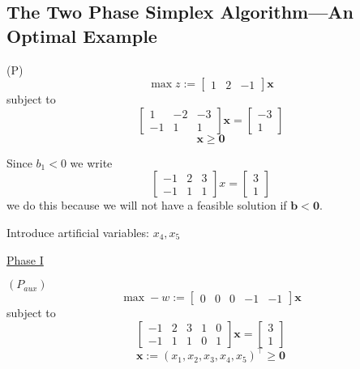 \subsection{The Two Phase Simplex Algorithm---An Optimal Example}
\begin{exbox}
    \begin{example}
        (P)
        \[ \max z:= \begin{bmatrix} 1 & 2 & -1 \end{bmatrix} \bm{x} \]
        subject to
        \[
            \begin{bmatrix}
                1  & -2 & -3 \\
                -1 & 1  & 1
            \end{bmatrix}
            \bm{x} =
            \begin{bmatrix}
                -3 \\
                1
            \end{bmatrix}
        \]
        \[ \bm{x}\geqslant  \bm{0} \]

        Since $ b_1<0 $
        we write
        \[ \begin{bmatrix}
                -1 & 2 & 3 \\
                -1 & 1 & 1
            \end{bmatrix}
            x=
            \begin{bmatrix}
                3 \\
                1
            \end{bmatrix}
        \]
        we do this because we will not have a feasible solution if $ \bm{b}<\bm{0} $.

        Introduce artificial variables: $ x_4, x_5 $

        \underline{Phase I}

        $ (P_{aux}) $
        \[\max -w:=\begin{bmatrix} 0 & 0 & 0 & -1 & -1 \end{bmatrix} \bm{x} \]
        subject to
        \[
            \begin{bmatrix}
                -1 & 2 & 3 & 1 & 0 \\
                -1 & 1 & 1 & 0 & 1
            \end{bmatrix}
            \bm{x}=
            \begin{bmatrix}
                3 \\
                1
            \end{bmatrix}
        \]
        \[ \bm{x}:=(x_1,x_2,x_3,x_4,x_5)^\top \geqslant  \bm{0} \]


\end{example}
\end{exbox}
